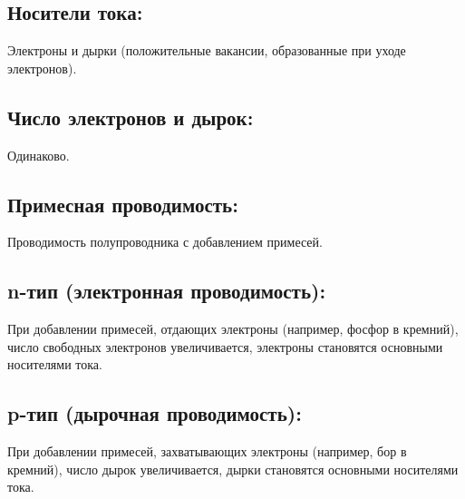 \documentclass[a4paper,12pt]{article}
\begin{document}
\vspace{-9pt}
\subsection*{Носители тока:}
\vspace{-3pt}
Электроны и дырки (положительные вакансии, образованные при уходе электронов).

\vspace{-9pt}
\subsection*{Число электронов и дырок:}
\vspace{-3pt}
Одинаково.

\vspace{-9pt}
\subsection*{Примесная проводимость:}
\vspace{-3pt}
Проводимость полупроводника с добавлением примесей.

\vspace{-9pt}
\subsection*{n-тип (электронная проводимость):}
\vspace{-3pt}
При добавлении примесей, отдающих электроны (например, фосфор в кремний), число свободных электронов увеличивается, электроны становятся основными носителями тока.

\vspace{-9pt}
\subsection*{p-тип (дырочная проводимость):}
\vspace{-3pt}
При добавлении примесей, захватывающих электроны (например, бор в кремний), число дырок увеличивается, дырки становятся основными носителями тока.
\end{document}
